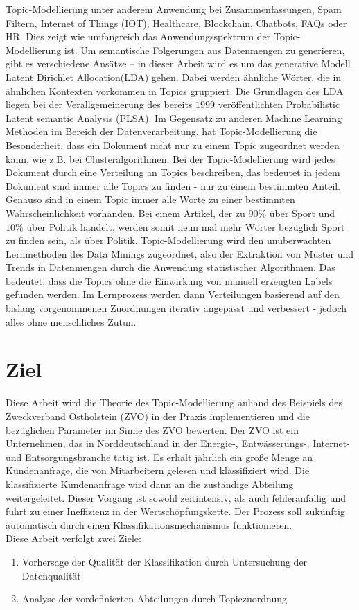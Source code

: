 \documentclass[german,version-2020-11]{uzl-thesis}
\begin{document}
Topic-Modellierung unter anderem Anwendung bei Zusammenfassungen, Spam Filtern, Internet of Things (IOT), Healthcare, Blockchain, Chatbots, FAQs oder HR. Dies zeigt wie umfangreich das Anwendungsspektrum der Topic-Modellierung ist. Um semantische Folgerungen aus Datenmengen zu generieren, gibt es verschiedene Ansätze – in dieser Arbeit wird es um das generative Modell Latent Dirichlet Allocation(LDA) gehen. Dabei werden ähnliche Wörter, die in ähnlichen Kontexten vorkommen in Topics gruppiert. Die Grundlagen des LDA liegen bei der Verallgemeinerung des bereits $1999$ veröffentlichten Probabilistic Latent semantic Analysis (PLSA). Im Gegensatz zu anderen Machine Learning Methoden im Bereich der Datenverarbeitung, hat Topic-Modellierung die Besonderheit, dass ein Dokument nicht nur zu einem Topic zugeordnet werden kann, wie z.B. bei Clusteralgorithmen. Bei der Topic-Modellierung wird jedes Dokument durch eine Verteilung an Topics beschreiben, das bedeutet in jedem Dokument sind immer alle Topics zu finden - nur zu einem bestimmten Anteil. Genauso sind in einem Topic immer alle Worte zu einer bestimmten Wahrscheinlichkeit vorhanden. Bei einem Artikel, der zu $90\%$ über Sport und $10\%$ über Politik handelt, werden somit neun mal mehr Wörter bezüglich Sport zu finden sein, als über Politik. Topic-Modellierung wird den unüberwachten Lernmethoden des Data Minings zugeordnet, also der Extraktion von Muster und Trends in Datenmengen durch die Anwendung statistischer Algorithmen. Das bedeutet, dass die Topics ohne die Einwirkung von manuell erzeugten Labels gefunden werden. Im Lernprozess werden dann Verteilungen basierend auf den bislang vorgenommenen Zuordnungen iterativ angepasst und verbessert - jedoch alles ohne menschliches Zutun. 

\section{Ziel}
Diese Arbeit wird die Theorie des Topic-Modellierung anhand des Beispiels des Zweckverband Ostholstein (ZVO) in der Praxis implementieren und die bezüglichen Parameter im Sinne des ZVO bewerten. Der ZVO ist ein Unternehmen, das in Norddeutschland in der Energie-, Entwässerungs-, Internet- und Entsorgungsbranche tätig ist.  Es erhält jährlich ein große Menge an Kundenanfrage, die von Mitarbeitern gelesen und klassifiziert wird. Die klassifizierte Kundenanfrage wird dann an die zuständige Abteilung weitergeleitet. Dieser Vorgang ist sowohl zeitintensiv, als auch fehleranfällig und führt zu einer Ineffizienz in der Wertschöpfungskette. Der Prozess soll zukünftig automatisch durch einen Klassifikationsmechanismus funktionieren. \\
Diese Arbeit verfolgt zwei Ziele: 
\begin{enumerate}
\item Vorhersage der Qualität der Klassifikation durch Untersuchung der Datenqualität
\item Analyse der vordefinierten Abteilungen durch Topiczuordnung
\end{enumerate}
\end{document}
